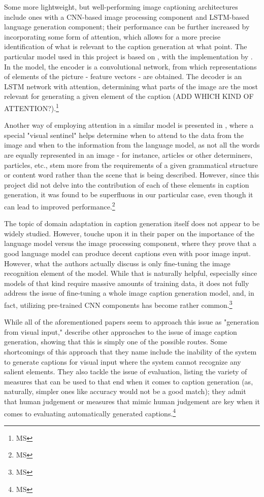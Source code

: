\documentclass[11pt]{article}
\begin{document}
Some more lightweight, but well-performing image captioning architectures include ones with a CNN-based image processing component and LSTM-based language generation component; their performance can be further increased by incorporating some form of attention, which allows for a more precise identification of what is relevant to the caption generation at what point. The particular model used in this project is based on \cite{xu2015attend}, with the implementation by \cite{ilinykh}. In the model, the encoder is a convolutional network, from which representations of elements of the picture - feature vectors - are obtained. The decoder is an LSTM network with attention, determining what parts of the image are the most relevant for generating a given element of the caption (ADD WHICH KIND OF ATTENTION?).\footnote{MS} 

Another way of employing attention in a similar model is presented in \cite{lu16}, where a special "visual sentinel" helps determine when to attend to the data from the image and when to the information from the language model, as not all the words are equally represented in an image - for instance, articles or other determiners, particles, etc., stem more from the requirements of a given grammatical structure or content word rather than the scene that is being described. However, since this project did not delve into the contribution of each of these elements in caption generation, it was found to be superfluous in our particular case, even though it can lead to improved performance.\footnote{MS}

The topic of domain adaptation in caption generation itself does not appear to be widely studied. However, \cite{hesselSW15} touche upon it in their paper on the importance of the language model versus the image processing component, where they prove that a good language model can produce decent captions even with poor image input. However, what the authors actually discuss is only fine-tuning the image recognition element of the model. While that is naturally helpful, especially since models of that kind require massive amounts of training data, it does not fully address the issue of fine-tuning a whole image caption generation model, and, in fact, utilizing pre-trained CNN components has become rather common.\footnote{MS}

While all of the aforementioned papers seem to approach this issue as "generation from visual input," \cite{bernardi16} describe other approaches to the issue of image caption generation, showing that this is simply one of the possible routes. Some shortcomings of this approach that they name include the inability of the system to generate captions for visual input where the system cannot recognize any salient elements. They also tackle the issue of evaluation, listing the variety of measures that can be used to that end when it comes to caption generation (as, naturally, simpler ones like accuracy would not be a good match); they admit that human judgement or measures that mimic human judgement are key when it comes to evaluating automatically generated captions.\footnote{MS}
\end{document}
